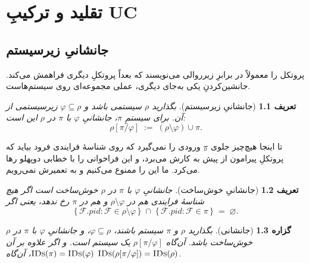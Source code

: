 \documentclass[10pt,oneside,openany]{book}
\newcommand{\PID}{\mathit{pid}}
\renewcommand{\emptyset}{\varnothing}
\newcommand{\F}{\mathcal{F}}
\newcommand{\op}[1]{\textnormal{\textsc{#1}}}
\newcommand{\IDs}{\op{IDs}}
\theoremstyle{accentdef}
\newtheorem{definition}{تعریف}[chapter]
\theoremstyle{accentplain}
\newtheorem{proposition}[definition]{گزاره}
\begin{document}

\chapter{تقلید و ترکیبِ UC}\label{sec:uc}

\section{جانشانیِ زیرسیستم}\label{sec:repl}

پروتکل را معمولاً در برابرِ زیرروالی می‌نویسند که بعداً پروتکلِ دیگری
فراهمش می‌کند. جانشین‌کردنِ یکی به‌جای دیگری، عملی مجموعه‌ای روی
سیستم‌هاست.

\begin{definition}[جانشانیِ زیرسیستم]\label{def:repl}
بگذارید $\rho$ سیستمی باشد و $\varphi \subseteq \rho$ زیرسیستمی از آن.
برای سیستمِ $\pi$، \emph{جانشانیِ $\varphi$ با $\pi$ در $\rho$} این است:
\[
  \rho[\pi/\varphi] \;:=\; (\rho \setminus \varphi) \cup \pi .
\]
\end{definition}

تا اینجا هیچ‌چیز جلوی $\pi$ِ ورودی را نمی‌گیرد که روی شناسهٔ فرایندی فرود
بیاید که پروتکلِ پیرامون از پیش به کارش می‌برد، و این فراخوانی را با
خطابی دوپهلو رها می‌کرد. ما این را ممنوع می‌کنیم و به تعمیرش نمی‌رویم.

\begin{definition}[جانشانیِ خوش‌ساخت]\label{def:wf}
جانشانیِ $\varphi$ با $\pi$ در $\rho$ \emph{خوش‌ساخت} است اگر هیچ شناسهٔ
فرایندی هم در $\rho \setminus \varphi$ و هم در $\pi$ رخ ندهد، یعنی اگر
\[
  \{\, \F.\PID : \F \in \rho \setminus \varphi \,\} \;\cap\; \{\, \F.\PID : \F \in \pi \,\} \;=\; \emptyset .
\]
\end{definition}

\begin{proposition}[جانشانی]\label{prop:repl}
بگذارید $\rho$ و $\pi$ سیستم باشند، $\varphi \subseteq \rho$، و جانشانیِ
$\varphi$ با $\pi$ در $\rho$ خوش‌ساخت باشد. آن‌گاه $\rho[\pi/\varphi]$ یک
سیستم است. و اگر علاوه بر آن $\IDs(\pi) = \IDs(\varphi)$، آن‌گاه
$\IDs(\rho[\pi/\varphi]) = \IDs(\rho)$.
\end{proposition}
\end{document}
